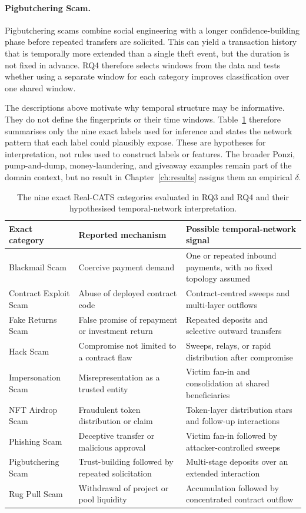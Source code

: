 \documentclass{thesisclass}
\begin{document}
\paragraph{Pigbutchering Scam.}
Pigbutchering scams combine social engineering with a longer confidence-building
phase before repeated transfers are solicited. This can yield a transaction history
that is temporally more extended than a single theft event, but the duration is not
fixed in advance. RQ4 therefore selects windows from the data and tests whether
using a separate window for each category improves classification over one shared
window.

\vspace{0.5em}
The descriptions above motivate why temporal structure may be informative. They do
not define the fingerprints or their time windows. Table~\ref{tab:scam_types}
therefore summarises only the nine exact labels used for inference and states the
network pattern that each label could plausibly expose. These are hypotheses for
interpretation, not rules used to construct labels or features. The broader Ponzi,
pump-and-dump, money-laundering, and giveaway examples remain part of the domain
context, but no result in Chapter~\ref{ch:results} assigns them an empirical
$\delta$.

\begin{table}[htbp]
\centering
\caption{The nine exact Real-CATS categories evaluated in RQ3 and RQ4 and their
hypothesised temporal-network interpretation.}
\label{tab:scam_types}
\footnotesize
\begin{tabular}{p{3.4cm} p{4.5cm} p{5.1cm}}
\toprule
\textbf{Exact category} & \textbf{Reported mechanism} & \textbf{Possible temporal-network signal} \\
\midrule
Blackmail Scam & Coercive payment demand & One or repeated inbound payments, with no fixed topology assumed \\
Contract Exploit Scam & Abuse of deployed contract code & Contract-centred sweeps and multi-layer outflows \\
Fake Returns Scam & False promise of repayment or investment return & Repeated deposits and selective outward transfers \\
Hack Scam & Compromise not limited to a contract flaw & Sweeps, relays, or rapid distribution after compromise \\
Impersonation Scam & Misrepresentation as a trusted entity & Victim fan-in and consolidation at shared beneficiaries \\
NFT Airdrop Scam & Fraudulent token distribution or claim & Token-layer distribution stars and follow-up interactions \\
Phishing Scam & Deceptive transfer or malicious approval & Victim fan-in followed by attacker-controlled sweeps \\
Pigbutchering Scam & Trust-building followed by repeated solicitation & Multi-stage deposits over an extended interaction \\
Rug Pull Scam & Withdrawal of project or pool liquidity & Accumulation followed by concentrated contract outflow \\
\bottomrule
\end{tabular}
\end{table}
\end{document}
